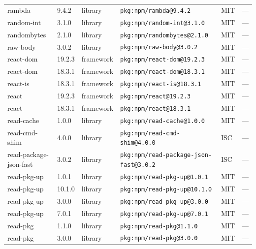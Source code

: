 \documentclass[11pt,a4paper]{article}
\begin{document}
\begin{longtable}{|p{4cm}|p{2cm}|p{1.6cm}|p{5cm}|p{1.5cm}|p{3.5cm}|}
\raggedright rambda & 9.4.2 & library & \small\texttt{pkg:npm/rambda@9.4.2} & MIT & \small — \\
\raggedright random-int & 3.1.0 & library & \small\texttt{pkg:npm/random-int@3.1.0} & MIT & \small — \\
\raggedright randombytes & 2.1.0 & library & \small\texttt{pkg:npm/randombytes@2.1.0} & MIT & \small — \\
\raggedright raw-body & 3.0.2 & library & \small\texttt{pkg:npm/raw-body@3.0.2} & MIT & \small — \\
\raggedright react-dom & 19.2.3 & framework & \small\texttt{pkg:npm/react-dom@19.2.3} & MIT & \small — \\
\raggedright react-dom & 18.3.1 & framework & \small\texttt{pkg:npm/react-dom@18.3.1} & MIT & \small — \\
\raggedright react-is & 18.3.1 & framework & \small\texttt{pkg:npm/react-is@18.3.1} & MIT & \small — \\
\raggedright react & 19.2.3 & framework & \small\texttt{pkg:npm/react@19.2.3} & MIT & \small — \\
\raggedright react & 18.3.1 & framework & \small\texttt{pkg:npm/react@18.3.1} & MIT & \small — \\
\raggedright read-cache & 1.0.0 & library & \small\texttt{pkg:npm/read-cache@1.0.0} & MIT & \small — \\
\raggedright read-cmd-shim & 4.0.0 & library & \small\texttt{pkg:npm/read-cmd-shim@4.0.0} & ISC & \small — \\
\raggedright read-package-json-fast & 3.0.2 & library & \small\texttt{pkg:npm/read-package-json-fast@3.0.2} & ISC & \small — \\
\raggedright read-pkg-up & 1.0.1 & library & \small\texttt{pkg:npm/read-pkg-up@1.0.1} & MIT & \small — \\
\raggedright read-pkg-up & 10.1.0 & library & \small\texttt{pkg:npm/read-pkg-up@10.1.0} & MIT & \small — \\
\raggedright read-pkg-up & 3.0.0 & library & \small\texttt{pkg:npm/read-pkg-up@3.0.0} & MIT & \small — \\
\raggedright read-pkg-up & 7.0.1 & library & \small\texttt{pkg:npm/read-pkg-up@7.0.1} & MIT & \small — \\
\raggedright read-pkg & 1.1.0 & library & \small\texttt{pkg:npm/read-pkg@1.1.0} & MIT & \small — \\
\raggedright read-pkg & 3.0.0 & library & \small\texttt{pkg:npm/read-pkg@3.0.0} & MIT & \small — \\

\end{longtable}
\end{document}
